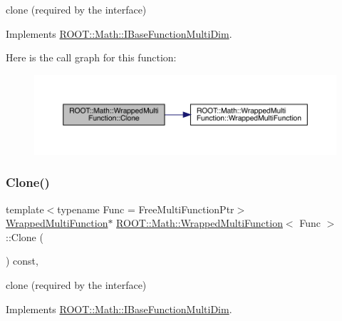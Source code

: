 clone (required by the interface) 



Implements \mbox{\hyperlink{classROOT_1_1Math_1_1IBaseFunctionMultiDim_a57939204b1f525b43835b42e0635dd3b}{R\+O\+O\+T\+::\+Math\+::\+I\+Base\+Function\+Multi\+Dim}}.

Here is the call graph for this function\+:
\nopagebreak
\begin{figure}[H]
\begin{center}
\leavevmode
\includegraphics[width=350pt]{de/da4/classROOT_1_1Math_1_1WrappedMultiFunction_aafa24e359a607b4278f1bf238bdbc336_cgraph}
\end{center}
\end{figure}
\mbox{\label{classROOT_1_1Math_1_1WrappedMultiFunction_aafa24e359a607b4278f1bf238bdbc336}} 
\subsubsection{\texorpdfstring{Clone()}{Clone()}\hspace{0.1cm}{\footnotesize\ttfamily [2/3]}}
{\footnotesize\ttfamily template$<$typename Func  = Free\+Multi\+Function\+Ptr$>$ \\
\mbox{\hyperlink{classROOT_1_1Math_1_1WrappedMultiFunction}{Wrapped\+Multi\+Function}}$\ast$ \mbox{\hyperlink{classROOT_1_1Math_1_1WrappedMultiFunction}{R\+O\+O\+T\+::\+Math\+::\+Wrapped\+Multi\+Function}}$<$ Func $>$\+::Clone (\begin{DoxyParamCaption}{ }\end{DoxyParamCaption}) const\hspace{0.3cm}{\ttfamily [inline]}, {\ttfamily [virtual]}}



clone (required by the interface) 



Implements \mbox{\hyperlink{classROOT_1_1Math_1_1IBaseFunctionMultiDim_a57939204b1f525b43835b42e0635dd3b}{R\+O\+O\+T\+::\+Math\+::\+I\+Base\+Function\+Multi\+Dim}}.

